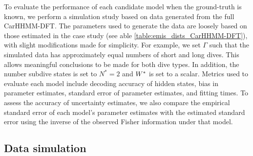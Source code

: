 

To evaluate the performance of each candidate model when the ground-truth is known, we perform a simulation study based on data generated from the full CarHHMM-DFT. The parameters used to generate the data are loosely based on those estimated in the case study (see able \ref{table:emis_dists_CarHHMM-DFT}), with slight modifications made for simplicity. For example, we set $\Gamma$ such that the simulated data has approximately equal numbers of short and long dives. This allows meaningful conclusions to be made for both dive types. In addition, the number subdive states is set to $N^*=2$ and $W^*$ is set to a scalar. Metrics used to evaluate each model include decoding accuracy of hidden states, bias in parameter estimates, standard error of parameter estimates, and fitting times. To assess the accuracy of uncertainty estimates, we also compare the empirical standard error of each model's parameter estimates with the estimated standard error using the inverse of the observed Fisher information under that model.

\subsection{Data simulation}

